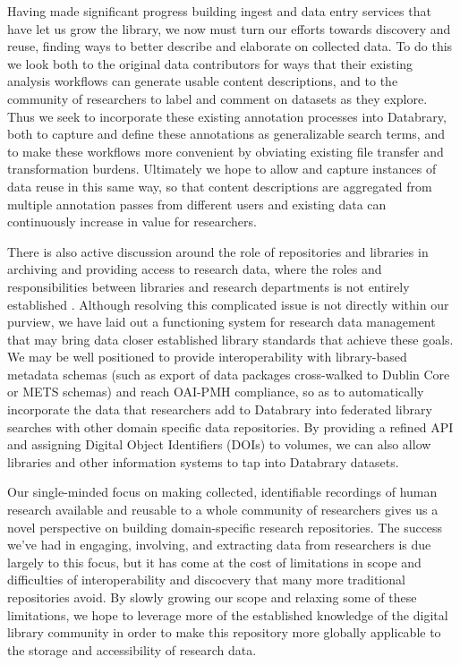 \documentclass{sig-alternate}
\begin{document}
Having made significant progress building ingest and data entry services that have let us grow the library, we now must turn our efforts towards discovery and reuse, finding ways to better describe and elaborate on collected data.
To do this we look both to the original data contributors for ways that their existing analysis workflows can generate usable content descriptions, and to the community of researchers to label and comment on datasets as they explore.
Thus we seek to incorporate these existing annotation processes into Databrary, both to capture and define these annotations as generalizable search terms, and to make these workflows more convenient by obviating existing file transfer and transformation burdens.
Ultimately we hope to allow and capture instances of data reuse in this same way, so that content descriptions are aggregated from multiple annotation passes from different users and existing data can continuously increase in value for researchers.

There is also active discussion around the role of repositories and libraries in archiving and providing access to research data, where the roles and responsibilities between libraries and research departments is not entirely established \cite{Castelli_etal_2013, Nielson_Hjørland_2014, Macmillan_2014, Pinfield_etal_2014}.
Although resolving this complicated issue is not directly within our purview, we have laid out a functioning system for research data management that may bring data closer established library standards that achieve these goals.
We may be well positioned to provide interoperability with library-based metadata schemas (such as export of data packages cross-walked to Dublin Core or METS schemas) and reach OAI-PMH compliance, so as to automatically incorporate the data that researchers add to Databrary into federated library searches with other domain specific data repositories.
By providing a refined API and assigning Digital Object Identifiers (DOIs) to volumes, we can also allow libraries and other information systems to tap into Databrary datasets.

Our single-minded focus on making collected, identifiable recordings of human research available and reusable to a whole community of researchers gives us a novel perspective on building domain-specific research repositories.
The success we've had in engaging, involving, and extracting data from researchers is due largely to this focus, but it has come at the cost of limitations in scope and difficulties of interoperability and discocvery that many more traditional repositories avoid.
By slowly growing our scope and relaxing some of these limitations, we hope to leverage more of the established knowledge of the digital library community in order to make this repository more globally applicable to the storage and accessibility of research data.
\end{document}
